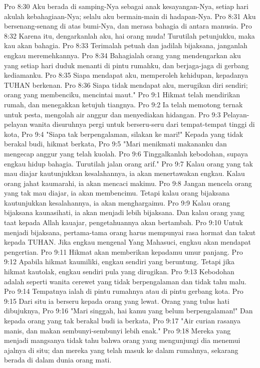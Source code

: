 Pro 8:30  Aku berada di samping-Nya sebagai anak kesayangan-Nya, setiap hari akulah kebahagiaan-Nya; selalu aku bermain-main di hadapan-Nya.
Pro 8:31  Aku bersenang-senang di atas bumi-Nya, dan merasa bahagia di antara manusia.
Pro 8:32  Karena itu, dengarkanlah aku, hai orang muda! Turutilah petunjukku, maka kau akan bahagia.
Pro 8:33  Terimalah petuah dan jadilah bijaksana, janganlah engkau meremehkannya.
Pro 8:34  Bahagialah orang yang mendengarkan aku yang setiap hari duduk menanti di pintu rumahku, dan berjaga-jaga di gerbang kediamanku.
Pro 8:35  Siapa mendapat aku, memperoleh kehidupan, kepadanya TUHAN berkenan.
Pro 8:36  Siapa tidak mendapat aku, merugikan diri sendiri; orang yang membenciku, mencintai maut."
Pro 9:1  Hikmat telah mendirikan rumah, dan menegakkan ketujuh tiangnya.
Pro 9:2  Ia telah memotong ternak untuk pesta, mengolah air anggur dan menyediakan hidangan.
Pro 9:3  Pelayan-pelayan wanita disuruhnya pergi untuk berseru-seru dari tempat-tempat tinggi di kota,
Pro 9:4  "Siapa tak berpengalaman, silakan ke mari!" Kepada yang tidak berakal budi, hikmat berkata,
Pro 9:5  "Mari menikmati makananku dan mengecap anggur yang telah kuolah.
Pro 9:6  Tinggalkanlah kebodohan, supaya engkau hidup bahagia. Turutilah jalan orang arif."
Pro 9:7  Kalau orang yang tak mau diajar kautunjukkan kesalahannya, ia akan menertawakan engkau. Kalau orang jahat kaumarahi, ia akan mencaci makimu.
Pro 9:8  Jangan mencela orang yang tak mau diajar, ia akan membencimu. Tetapi kalau orang bijaksana kautunjukkan kesalahannya, ia akan menghargaimu.
Pro 9:9  Kalau orang bijaksana kaunasihati, ia akan menjadi lebih bijaksana. Dan kalau orang yang taat kepada Allah kauajar, pengetahuannya akan bertambah.
Pro 9:10  Untuk menjadi bijaksana, pertama-tama orang harus mempunyai rasa hormat dan takut kepada TUHAN. Jika engkau mengenal Yang Mahasuci, engkau akan mendapat pengertian.
Pro 9:11  Hikmat akan memberikan kepadamu umur panjang.
Pro 9:12  Apabila hikmat kaumiliki, engkau sendiri yang beruntung. Tetapi jika hikmat kautolak, engkau sendiri pula yang dirugikan.
Pro 9:13  Kebodohan adalah seperti wanita cerewet yang tidak berpengalaman dan tidak tahu malu.
Pro 9:14  Tempatnya ialah di pintu rumahnya atau di pintu gerbang kota.
Pro 9:15  Dari situ ia berseru kepada orang yang lewat. Orang yang tulus hati dibujuknya,
Pro 9:16  "Mari singgah, hai kamu yang belum berpengalaman!" Dan kepada orang yang tak berakal budi ia berkata,
Pro 9:17  "Air curian rasanya manis, dan makan sembunyi-sembunyi lebih enak."
Pro 9:18  Mereka yang menjadi mangsanya tidak tahu bahwa orang yang mengunjungi dia menemui ajalnya di situ; dan mereka yang telah masuk ke dalam rumahnya, sekarang berada di dalam dunia orang mati.
